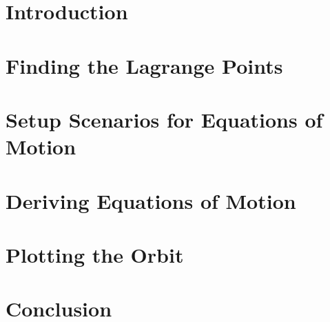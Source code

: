 \documentclass[12pt]{article}
\begin{document}
	
	
	\tableofcontents
	
	\newpage
	
	\section{Introduction}
	
	
	
	\section{Finding the Lagrange Points}
	
	
	
	\section{Setup Scenarios for Equations of Motion}
	
	
	
	\newpage
	
	\section{Deriving Equations of Motion}
	
	
	
	\section{Plotting the Orbit}
	
	\section{Conclusion}
	
	\newpage
	
	\printbibliography[
	heading=bibintoc,
	title={References}
	]
	
\end{document}
